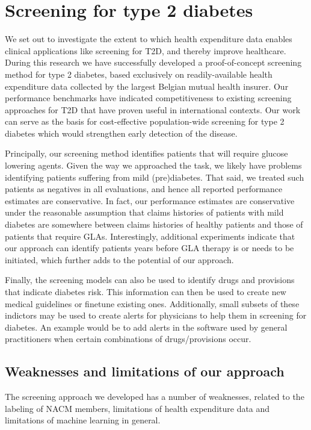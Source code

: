 \section{Screening for type 2 diabetes} \label{conclusion:screening}
We set out to investigate the extent to which health expenditure data enables clinical applications like screening for T2D, and thereby improve healthcare. During this research we have successfully developed a proof-of-concept screening method for type 2 diabetes, based exclusively on readily-available health expenditure data collected by the largest Belgian mutual health insurer. Our performance benchmarks have indicated competitiveness to existing screening approaches for T2D that have proven useful in international contexts. Our work can serve as the basis for cost-effective population-wide screening for type 2 diabetes which would strengthen early detection of the disease.

Principally, our screening method identifies patients that will require glucose lowering agents. Given the way we approached the task, we likely have problems identifying patients suffering from mild (pre)diabetes. That said, we treated such patients as negatives in all evaluations, and hence all reported performance estimates are conservative. In fact, our performance estimates are conservative under the reasonable assumption that claims histories of patients with mild diabetes are somewhere between claims histories of healthy patients and those of patients that require GLAs. Interestingly, additional experiments indicate that our approach can identify patients years before GLA therapy is or needs to be initiated, which further adds to the potential of our approach.

Finally, the screening models can also be used to identify drugs and provisions that indicate diabetes risk. This information can then be used to create new medical guidelines or finetune existing ones. Additionally, small subsets of these indictors may be used to create alerts for physicians to help them in screening for diabetes. An example would be to add alerts in the software used by general practitioners when certain combinations of drugs/provisions occur.

\subsection{Weaknesses and limitations of our approach}
The screening approach we developed has a number of weaknesses, related to the labeling of NACM members, limitations of health expenditure data and limitations of machine learning in general.%

